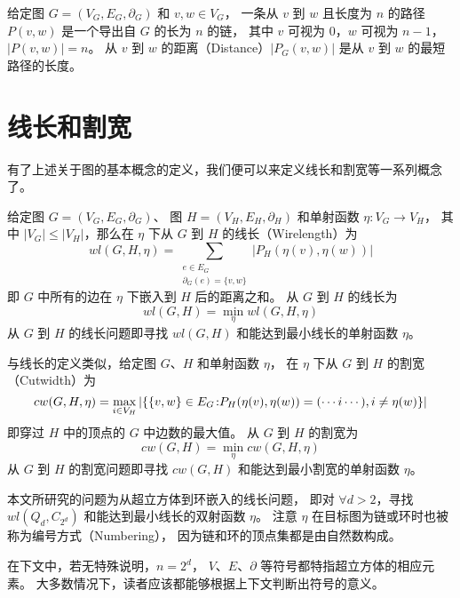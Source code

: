 给定图 $G = (V_G, E_G, \partial_G)$ 和 $v, w \in V_G$，
一条从 $v$ 到 $w$ 且长度为 $n$ 的路径 $P(v, w)$ 是一个导出自 $G$ 的长为 $n$ 的链，
其中 $v$ 可视为 $0$，$w$ 可视为 $n - 1$，$|P(v, w)| = n$。
从 $v$ 到 $w$ 的距离（Distance）$|P_G(v, w)|$ 是从 $v$ 到 $w$ 的最短路径的长度。

\section{线长和割宽}
\label{Section 2.2}

有了上述关于图的基本概念的定义，我们便可以来定义线长和割宽等一系列概念了。

给定图 $G = (V_G, E_G, \partial_G)$、
图 $H = (V_H, E_H, \partial_H)$ 和单射函数 $\eta \colon V_G \rightarrow V_H$，
其中 $|V_G| \le |V_H|$，那么在 $\eta$ 下从 $G$ 到 $H$ 的线长（Wirelength）为
\begin{equation*}
wl(G, H, \eta) = \sum_{\substack{
	e \in E_G \\
	\partial_G(e) = \{v, w\}
}} |P_H(\eta(v), \eta(w))|
\end{equation*}
即 $G$ 中所有的边在 $\eta$ 下嵌入到 $H$ 后的距离之和。
从 $G$ 到 $H$ 的线长为
\begin{equation*}
wl(G, H) = \min_{\eta} wl(G, H, \eta)
\end{equation*}
从 $G$ 到 $H$ 的线长问题即寻找 $wl(G, H)$ 和能达到最小线长的单射函数 $\eta$。

与线长的定义类似，给定图 $G$、$H$ 和单射函数 $\eta$，
在 $\eta$ 下从 $G$ 到 $H$ 的割宽（Cutwidth）为
\begin{equation*}
cw(G, H, \eta) = \max_{i \in V_H} |\{\{v, w\} \in E_G \colon \\
P_H(\eta(v), \eta(w)) = (\cdots i \cdots), i \neq \eta(w)\}|
\end{equation*}
即穿过 $H$ 中的顶点的 $G$ 中边数的最大值。
从 $G$ 到 $H$ 的割宽为
\begin{equation*}
cw(G, H) = \min_{\eta} cw(G, H, \eta)
\end{equation*}
从 $G$ 到 $H$ 的割宽问题即寻找 $cw(G, H)$ 和能达到最小割宽的单射函数 $\eta$。

本文所研究的问题为从超立方体到环嵌入的线长问题，
即对 $\forall d > 2$，寻找 $wl(Q_d, C_{2^d})$ 和能达到最小线长的双射函数 $\eta$。
注意 $\eta$ 在目标图为链或环时也被称为编号方式（Numbering），
因为链和环的顶点集都是由自然数构成。

在下文中，若无特殊说明，$n = 2^d$，
$V$、$E$、$\partial$ 等符号都特指超立方体的相应元素。
大多数情况下，读者应该都能够根据上下文判断出符号的意义。

